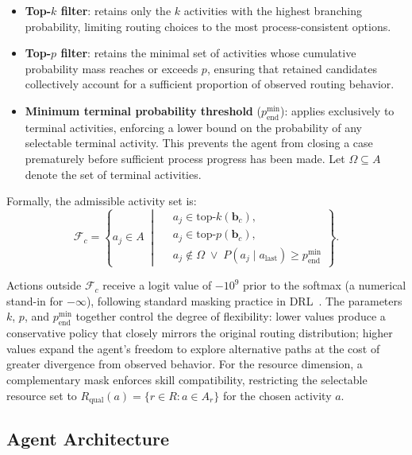 \documentclass[journal,onecolumn]{IEEEtran}
\begin{document}
\begin{itemize}
    \item \textbf{Top-$k$ filter}: retains only the $k$
    activities with the highest branching probability, limiting
    routing choices to the most process-consistent options.

    \item \textbf{Top-$p$ filter}: retains the minimal set of
    activities whose cumulative probability mass reaches or
    exceeds $p$, ensuring that retained candidates collectively
    account for a sufficient proportion of observed routing
    behavior.

    \item \textbf{Minimum terminal probability threshold}
    ($p_{\mathrm{end}}^{\min}$): applies exclusively to terminal
    activities, enforcing a lower bound on the probability of
    any selectable terminal activity. This prevents the agent
    from closing a case prematurely before sufficient process
    progress has been made. Let $\Omega \subseteq A$ denote the
    set of terminal activities.
\end{itemize}

Formally, the admissible activity set is:
\[
\mathcal{F}_c =
\left\{
a_j \in A \;\middle|\;
\begin{aligned}
& a_j \in \mathrm{top}\text{-}k(\mathbf{b}_c), \\
& a_j \in \mathrm{top}\text{-}p(\mathbf{b}_c), \\
& a_j \notin \Omega \;\lor\;
  P(a_j \mid a_{\mathrm{last}}) \ge p_{\mathrm{end}}^{\min}
\end{aligned}
\right\}.
\]

Actions outside $\mathcal{F}_c$ receive a logit value of
$-10^9$ prior to the softmax (a numerical stand-in for $-\infty$), following standard masking
practice in DRL~\cite{Learning_policies_drl}. The parameters
$k$, $p$, and $p_{\mathrm{end}}^{\min}$ together control the
degree of flexibility: lower values produce a conservative policy
that closely mirrors the original routing distribution; higher
values expand the agent's freedom to explore alternative paths
at the cost of greater divergence from observed behavior. For
the resource dimension, a complementary mask enforces skill
compatibility, restricting the selectable resource set to
$R_{\text{qual}}(a) = \{r \in R : a \in A_r\}$ for the chosen
activity $a$.

\subsection{Agent Architecture}
\end{document}
